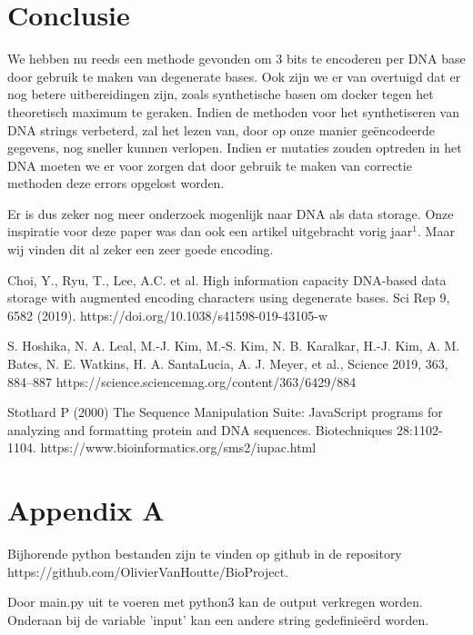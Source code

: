 \documentclass{esannV2}
\begin{document}
\section{Conclusie}

We hebben nu reeds een methode gevonden om 3 bits te encoderen per DNA base door gebruik te maken van degenerate bases. Ook zijn we er van overtuigd dat er nog betere uitbereidingen zijn, zoals synthetische basen om docker tegen het theoretisch maximum te geraken. Indien de methoden voor het synthetiseren van DNA strings verbeterd, zal het lezen van, door op onze manier ge\"encodeerde gegevens, nog sneller kunnen verlopen. Indien er mutaties zouden optreden in het DNA moeten we er voor zorgen dat door gebruik te maken van correctie methoden deze errors opgelost worden.

Er is dus zeker nog meer onderzoek mogenlijk naar DNA als data storage. Onze inspiratie voor deze paper was dan ook een artikel uitgebracht vorig jaar$^1$. Maar wij vinden dit al zeker een zeer goede encoding.


\newpage
\begin{footnotesize}

\begin{thebibliography}{99}
	 Choi, Y., Ryu, T., Lee, A.C. et al. High information capacity DNA-based data storage with augmented encoding characters using degenerate bases. Sci Rep 9, 6582 (2019). https://doi.org/10.1038/s41598-019-43105-w

	S. Hoshika, N. A. Leal, M.-J. Kim, M.-S. Kim, N. B. Karalkar, H.-J. Kim, A. M. Bates, N. E. Watkins, H. A. SantaLucia, A. J. Meyer, et al., Science 2019, 363, 884–887
    https://science.sciencemag.org/content/363/6429/884
    
    Stothard P (2000) The Sequence Manipulation Suite: JavaScript programs for analyzing and formatting protein and DNA sequences. Biotechniques 28:1102-1104.
    https://www.bioinformatics.org/sms2/iupac.html
    

\end{thebibliography}
\end{footnotesize}

\section*{Appendix A}
Bijhorende python bestanden zijn te vinden op github in de repository\\ https://github.com/OlivierVanHoutte/BioProject.

Door main.py uit te voeren met python3 kan de output verkregen worden. Onderaan bij de variable 'input' kan een andere string gedefinie\"erd worden.
\end{document}
